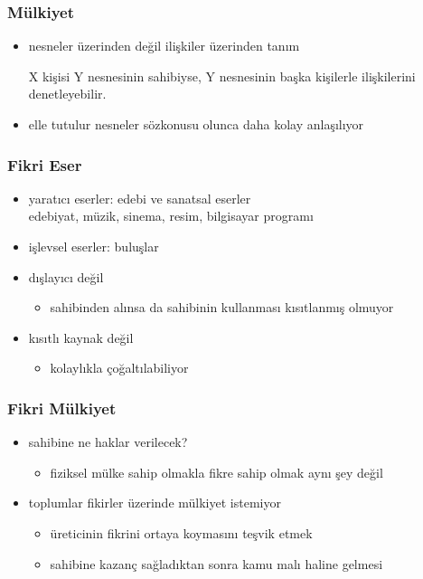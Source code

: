 \documentclass[dvipsnames]{beamer}
\theoremstyle{definition}
\theoremstyle{example}
\theoremstyle{plain}
\begin{document}
\begin{frame}
  \frametitle{Mülkiyet}

  \begin{itemize}
    \item nesneler üzerinden değil ilişkiler üzerinden tanım

    \medskip
    X kişisi Y nesnesinin sahibiyse, Y nesnesinin başka kişilerle ilişkilerini
    denetleyebilir.

    \pause
    \medskip
    \item elle tutulur nesneler sözkonusu olunca daha kolay anlaşılıyor
  \end{itemize}
\end{frame}

\begin{frame}
  \frametitle{Fikri Eser}

  \begin{itemize}
    \item yaratıcı eserler: edebi ve sanatsal eserler\\
      edebiyat, müzik, sinema, resim, bilgisayar programı
    \item işlevsel eserler: buluşlar
  \end{itemize}

  \pause
  \bigskip
  \begin{itemize}
    \item dışlayıcı değil
    \begin{itemize}
      \item sahibinden alınsa da sahibinin kullanması kısıtlanmış olmuyor
    \end{itemize}

    \item kısıtlı kaynak değil
    \begin{itemize}
      \item kolaylıkla çoğaltılabiliyor
    \end{itemize}
  \end{itemize}
\end{frame}

\begin{frame}
  \frametitle{Fikri Mülkiyet}

  \begin{itemize}
    \item sahibine ne haklar verilecek?
    \begin{itemize}
      \item fiziksel mülke sahip olmakla fikre sahip olmak aynı şey değil
    \end{itemize}

    \pause
    \bigskip
    \item toplumlar fikirler üzerinde mülkiyet istemiyor
    \begin{itemize}
      \item üreticinin fikrini ortaya koymasını teşvik etmek
      \item sahibine kazanç sağladıktan sonra kamu malı haline gelmesi
    \end{itemize}
  \end{itemize}
\end{frame}
\end{document}
